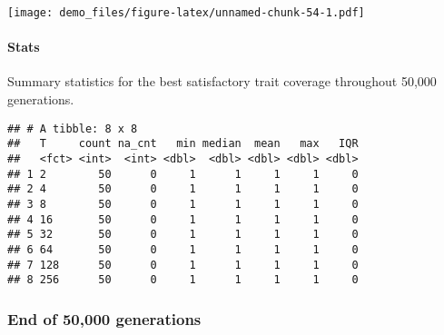 \documentclass[]{book}
\newenvironment{Shaded}{\begin{snugshade}}{\end{snugshade}}
\newcommand{\DataTypeTok}[1]{\textcolor[rgb]{0.13,0.29,0.53}{#1}}
\newcommand{\KeywordTok}[1]{\textcolor[rgb]{0.13,0.29,0.53}{\textbf{#1}}}
\newcommand{\NormalTok}[1]{#1}
\newcommand{\OperatorTok}[1]{\textcolor[rgb]{0.81,0.36,0.00}{\textbf{#1}}}
\newcommand{\OtherTok}[1]{\textcolor[rgb]{0.56,0.35,0.01}{#1}}
\newcommand{\StringTok}[1]{\textcolor[rgb]{0.31,0.60,0.02}{#1}}
\let\oldparagraph\paragraph
\renewcommand{\paragraph}[1]{\oldparagraph{#1}\mbox{}}
\begin{document}
\texttt{[image: demo\_files/figure-latex/unnamed-chunk-54-1.pdf]}

\hypertarget{stats-31}{%
\paragraph{Stats}\label{stats-31}}

Summary statistics for the best satisfactory trait coverage throughout 50,000 generations.

\begin{Shaded}
\end{Shaded}

\begin{verbatim}
## # A tibble: 8 x 8
##   T     count na_cnt   min median  mean   max   IQR
##   <fct> <int>  <int> <dbl>  <dbl> <dbl> <dbl> <dbl>
## 1 2        50      0     1      1     1     1     0
## 2 4        50      0     1      1     1     1     0
## 3 8        50      0     1      1     1     1     0
## 4 16       50      0     1      1     1     1     0
## 5 32       50      0     1      1     1     1     0
## 6 64       50      0     1      1     1     1     0
## 7 128      50      0     1      1     1     1     0
## 8 256      50      0     1      1     1     1     0
\end{verbatim}

\hypertarget{end-of-50000-generations-14}{%
\subsubsection{End of 50,000 generations}\label{end-of-50000-generations-14}}
\end{document}

